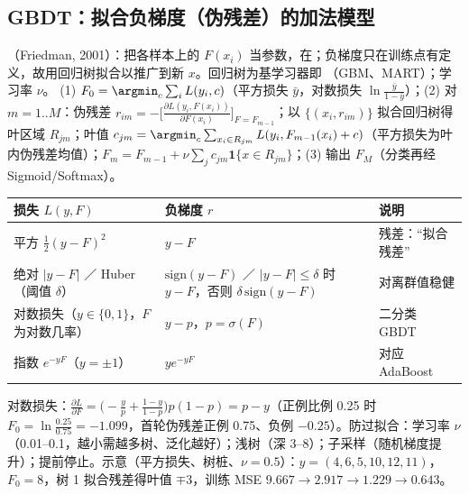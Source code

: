 \subsection{GBDT：拟合负梯度（伪残差）的加法模型}
（Friedman, 2001）：把各样本上的 $F(x_i)$ 当参数，在；负梯度只在训练点有定义，故用回归树拟合以推广到新 $x$。回归树为基学习器即 （GBM、MART）；学习率 $\nu$。
(1) $F_0=\argmin_c\sum_iL(y_i,c)$（平方损失 $\bar y$，对数损失 $\ln\frac{\bar y}{1-\bar y}$）；(2) 对 $m=1..M$：伪残差 $r_{im}=-\big[\frac{\partial L(y_i,F(x_i))}{\partial F(x_i)}\big]_{F=F_{m-1}}$；以 $\{(x_i,r_{im})\}$ 拟合回归树得叶区域 $R_{jm}$；叶值 $c_{jm}=\argmin_c\sum_{x_i\in R_{jm}}L(y_i,F_{m-1}(x_i)+c)$（平方损失为叶内伪残差均值）；$F_m=F_{m-1}+\nu\sum_jc_{jm}\mathbf 1\{x\in R_{jm}\}$；(3) 输出 $F_M$（分类再经 Sigmoid/Softmax）。
\begin{center}\small
\begin{tabularx}{\linewidth}{@{}p{5.4cm}p{4.8cm}L@{}}
\toprule
损失 $L(y,F)$ & 负梯度 $r$ & 说明 \\
\midrule
平方 $\frac12(y-F)^2$ & $y-F$ & 残差：“拟合残差” \\
绝对 $|y-F|$ ／ Huber（阈值 $\delta$） & $\mathrm{sign}(y-F)$ ／ $|y-F|\le\delta$ 时 $y-F$，否则 $\delta\,\mathrm{sign}(y-F)$ & 对离群值稳健 \\
对数损失（$y\in\{0,1\}$，$F$ 为对数几率） & $y-p$，$p=\sigma(F)$ & 二分类 GBDT \\
指数 $e^{-yF}$（$y=\pm1$） & $ye^{-yF}$ & 对应 AdaBoost \\
\bottomrule
\end{tabularx}
\end{center}
对数损失：$\frac{\partial L}{\partial F}=\big(-\frac yp+\frac{1-y}{1-p}\big)p(1-p)=p-y$（正例比例 0.25 时 $F_0=\ln\frac{0.25}{0.75}=-1.099$，首轮伪残差正例 0.75、负例 $-0.25$）。防过拟合：学习率 $\nu$（0.01–0.1，越小需越多树、泛化越好）；浅树（深 3–8）；子采样（随机梯度提升）；提前停止。示意（平方损失、树桩、$\nu=0.5$）：$y=(4,6,5,10,12,11)$，$F_0=8$，树 1 拟合残差得叶值 $\mp3$，训练 MSE $9.667\to2.917\to1.229\to0.643$。

